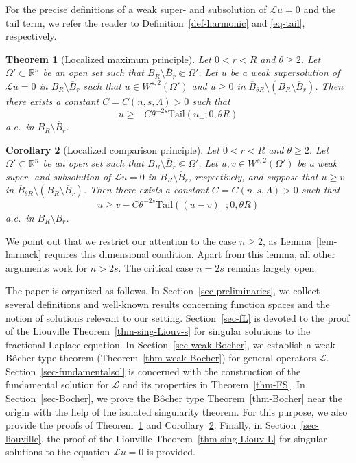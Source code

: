 \documentclass[11pt]{amsart}
\theoremstyle{plain}
\newtheorem{theorem}{Theorem}[section]
\newtheorem{corollary}[theorem]{Corollary}
\theoremstyle{definition}
\numberwithin{equation}{section}
\begin{document}
For the precise definitions of a weak super- and subsolution of $\mathcal{L}u=0$ and the tail term, we refer the reader to Definition~\ref{def-harmonic} and \eqref{eq-tail}, respectively.

\begin{theorem}[Localized maximum principle]\label{thm-loc-max}
Let $0<r<R$ and $\theta \geq 2$. Let $\Omega' \subset \mathbb{R}^n$ be an open set such that $B_R \setminus \overline{B}_r \Subset \Omega'$. Let $u$ be a weak supersolution of $\mathcal{L}u=0$ in $B_R \setminus \overline{B}_r$ such that $u \in W^{s, 2}(\Omega')$ and $u \geq 0$ in $\overline{B}_{\theta R} \setminus (B_R \setminus \overline{B}_r)$. Then there exists a constant $C=C(n, s, \Lambda)>0$ such that
\begin{equation*}
u \geq - C\theta^{-2s}\mathrm{Tail}(u_-; 0, \theta R)
\end{equation*}
a.e.\ in $B_R \setminus \overline{B}_r$.
\end{theorem}

\begin{corollary}[Localized comparison principle]\label{cor-loc-comp}
Let $0<r<R$ and $\theta \geq 2$. Let $\Omega' \subset \mathbb{R}^n$ be an open set such that $B_R \setminus \overline{B}_r \Subset \Omega'$. Let $u, v \in W^{s, 2}(\Omega')$ be a weak super- and subsolution of $\mathcal{L}u=0$ in $B_R \setminus \overline{B}_r$, respectively, and suppose that $u \geq v$ in $\overline{B}_{\theta R} \setminus (B_R \setminus \overline{B}_r)$. Then there exists a constant $C=C(n, s, \Lambda)>0$ such that
\begin{equation*}
u \geq v - C \theta^{-2s} \mathrm{Tail}((u-v)_-; 0, \theta R)
\end{equation*}
a.e.\ in $B_R \setminus \overline{B}_r$.
\end{corollary}

We point out that we restrict our attention to the case $n \geq 2$, as Lemma~\ref{lem-harnack} requires this dimensional condition. Apart from this lemma, all other arguments work for $n>2s$. The critical case $n=2s$ remains largely open.

The paper is organized as follows. In Section~\ref{sec-preliminaries}, we collect several definitions and well-known results concerning function spaces and the notion of solutions relevant to our setting. Section~\ref{sec-fL} is devoted to the proof of the Liouville Theorem~\ref{thm-sing-Liouv-s} for singular solutions to the fractional Laplace equation. In Section~\ref{sec-weak-Bocher}, we establish a weak Bôcher type theorem (Theorem~\ref{thm-weak-Bocher}) for general operators $\mathcal{L}$. Section~\ref{sec-fundamentalsol} is concerned with the construction of the fundamental solution for $\mathcal{L}$ and its properties in Theorem~\ref{thm-FS}. In Section~\ref{sec-Bocher}, we prove the B\^ocher type Theorem~\ref{thm-Bocher} near the origin with the help of the isolated singularity theorem. For this purpose, we also provide the proofs of Theorem~\ref{thm-loc-max} and Corollary~\ref{cor-loc-comp}. Finally, in Section~\ref{sec-liouville}, the proof of the Liouville Theorem~\ref{thm-sing-Liouv-L} for singular solutions to the equation $\mathcal{L}u=0$ is provided.
\end{document}
